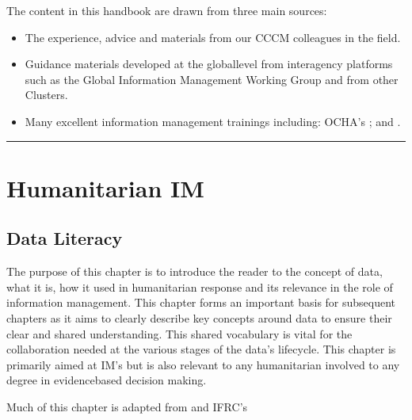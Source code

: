 \documentclass[letterpaper,10pt,english]{jupyterBook}
\begin{document}
\sphinxAtStartPar
The content in this handbook are drawn from three main sources:
\begin{itemize}
\item {} 
\sphinxAtStartPar
The experience, advice and materials from our CCCM colleagues in the field.

\item {} 
\sphinxAtStartPar
Guidance materials developed at the global\sphinxhyphen{}level from inter\sphinxhyphen{}agency platforms such as the Global Information Management Working Group and from other Clusters.

\item {} 
\sphinxAtStartPar
Many excellent information management trainings including: OCHA’s ; and .

\end{itemize}


\bigskip\hrule\bigskip



\part{Humanitarian IM}


\chapter{Data Literacy}
\label{\detokenize{part1/data literacy:data-literacy}}\label{\detokenize{part1/data literacy::doc}}
\sphinxAtStartPar
The purpose of this chapter is to introduce the reader to the concept of data, what it is, how it used in humanitarian response and its relevance in the role of information management. This chapter forms an important basis for subsequent chapters as it aims to clearly describe key concepts around data to ensure their clear and shared understanding. This shared vocabulary is vital for the collaboration needed at the various stages of the data’s lifecycle. This chapter is primarily aimed at IM’s but is also relevant to any humanitarian involved to any degree in evidence\sphinxhyphen{}based decision making.%
\begin{footnote}[1]\sphinxAtStartFootnote
Much of this chapter is adapted from  and IFRC’s 
%
\end{footnote}
\end{document}

